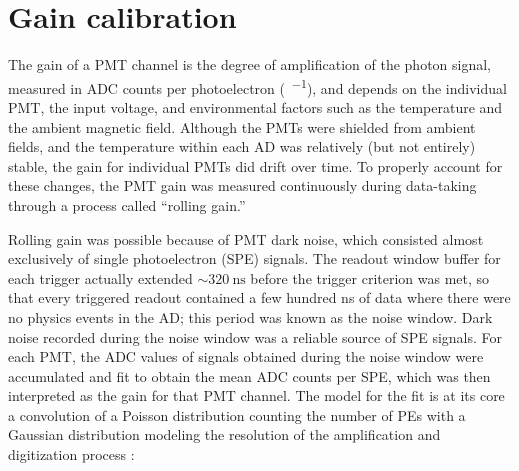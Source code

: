 \section{Gain calibration}
\label{sec:gain}

The gain of a PMT channel is the degree of amplification
of the photon signal,
measured in ADC counts per photoelectron (\si{\adc\per\pe}),
and depends on the individual PMT, the input voltage,
and environmental factors such as the temperature
and the ambient magnetic field.
Although the PMTs were shielded from ambient fields,
and the temperature within each AD was relatively (but not entirely) stable,
the gain for individual PMTs did drift over time.
To properly account for these changes,
the PMT gain was measured continuously during data-taking
through a process called ``rolling gain.''

Rolling gain was possible because of PMT dark noise,
which consisted almost exclusively of single photoelectron (SPE) signals.
The readout window buffer for each trigger actually extended $\sim\SI{320}{\ns}$
before the trigger criterion was met,
so that every triggered readout contained a few hundred \si{\ns}
of data where there were no physics events in the AD;
this period was known as the noise window.
Dark noise recorded during the noise window was a reliable source
of SPE signals.
For each PMT, the ADC values of signals obtained during the noise window
were accumulated and fit to obtain the mean ADC counts per SPE,
which was then interpreted as the gain for that PMT channel.
The model for the fit is at its core a convolution of
a Poisson distribution counting the number of PEs
with a Gaussian distribution modeling the resolution of
the amplification and digitization process \cite{spe_calib}:

